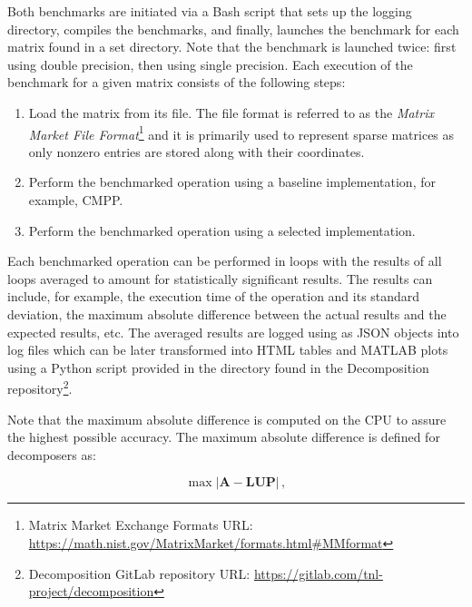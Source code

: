 Both benchmarks are initiated via a Bash script that sets up the logging directory, compiles the benchmarks, and finally, launches the benchmark for each matrix found in a set directory.
Note that the benchmark is launched twice: first using double precision, then using single precision.
Each execution of the benchmark for a given matrix consists of the following steps:

\begin{enumerate}
	\item Load the matrix from its  file.
The  file format is referred to as the \textit{Matrix Market File Format}\footnote{Matrix Market Exchange Formats URL: \url{https://math.nist.gov/MatrixMarket/formats.html\#MMformat}} and it is primarily used to represent sparse matrices as only nonzero entries are stored along with their coordinates.
	\item \label{Item:implementation->decomposition-project->benchmarks->procedure->baseline-operation}
		Perform the benchmarked operation using a baseline implementation, for example, CMPP.
	\item \label{Item:implementation->decomposition-project->benchmarks->procedure->selected-operations}
		Perform the benchmarked operation using a selected implementation.
\end{enumerate}

Each benchmarked operation can be performed in loops with the results of all loops averaged to amount for statistically significant results.
The results can include, for example, the execution time of the operation and its standard deviation, the maximum absolute difference between the actual results and the expected results, etc.
The averaged results are logged using  as JSON objects into log files which can be later transformed into HTML tables and MATLAB plots using a Python script provided in the  directory found in the Decomposition repository\footnote{Decomposition GitLab repository URL: \url{https://gitlab.com/tnl-project/decomposition}}.

Note that the maximum absolute difference is computed on the CPU to assure the highest possible accuracy.
The maximum absolute difference is defined for decomposers as:

\begin{equation}
	\max \left| \mathbf{A} - \mathbf{LUP} \right| \,,
	\label{Equation:implementation->decomposition-project->benchmarks->decomposers->maximum-difference}
\end{equation}

